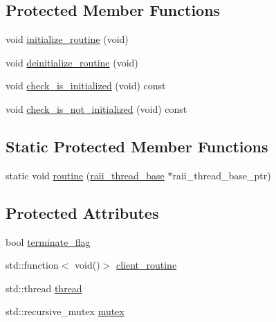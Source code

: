 \subsection*{Protected Member Functions}
\begin{DoxyCompactItemize}
\item 
void \hyperlink{classxstd_1_1raii__thread__base_ad3b035606a096d6117de8de40c665507}{initialize\-\_\-routine} (void)
\item 
void \hyperlink{classxstd_1_1raii__thread__base_ae423d8023eb8c3bed9b4b0f11c055c2d}{deinitialize\-\_\-routine} (void)
\item 
void \hyperlink{classxstd_1_1raii__thread__base_aef97fe42b58be66ddd0bf90462b772a8}{check\-\_\-is\-\_\-initialized} (void) const 
\item 
void \hyperlink{classxstd_1_1raii__thread__base_a6a179dd57da4ec48177c0cd38da0702e}{check\-\_\-is\-\_\-not\-\_\-initialized} (void) const 
\end{DoxyCompactItemize}
\subsection*{Static Protected Member Functions}
\begin{DoxyCompactItemize}
\item 
static void \hyperlink{classxstd_1_1raii__thread__base_aac990e420873b2bb520e677156c37978}{routine} (\hyperlink{classxstd_1_1raii__thread__base}{raii\-\_\-thread\-\_\-base} $\ast$raii\-\_\-thread\-\_\-base\-\_\-ptr)
\end{DoxyCompactItemize}
\subsection*{Protected Attributes}
\begin{DoxyCompactItemize}
\item 
bool \hyperlink{classxstd_1_1raii__thread__base_aaac3bfb5572d71de17cb71d7ed0bb15c}{terminate\-\_\-flag}
\item 
std\-::function$<$ void()$>$ \hyperlink{classxstd_1_1raii__thread__base_a6b3e160c7eb131008410a16c460b03ff}{client\-\_\-routine}
\item 
std\-::thread \hyperlink{classxstd_1_1raii__thread__base_a664b3c47514557c3047e4ee0d7d9f25f}{thread}
\item 
std\-::recursive\-\_\-mutex \hyperlink{classxstd_1_1raii__thread__base_a9d9e01fced1a4f58ea5a9cc165f54fe3}{mutex}
\end{DoxyCompactItemize}


